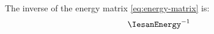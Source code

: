 The inverse of the energy matrix \eqref{eq:energy-matrix} is:
\begin{equation*}
\begin{aligned}
\IesanEnergy^{-1}
%

\end{aligned}
\end{equation*}
